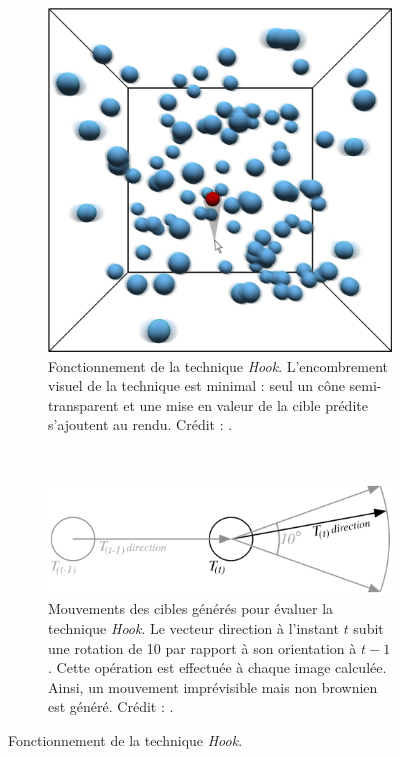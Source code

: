 	\begin{figure}[htb]
		\begin{subfigure}{.29\textwidth}
			\centering
			\includegraphics[width=\textwidth]{figures/ch2/hookPic}
			\caption[\emph{Hook} -- fonctionnement]{Fonctionnement de la technique \emph{Hook}. L'encombrement visuel de la technique est minimal : seul un cône semi-transparent et une mise en valeur de la cible prédite s'ajoutent au rendu. Crédit : \cite{ortega2013hook}.}
			\label{fig:hookPic}
		\end{subfigure}
		~
		\begin{subfigure}{.69\textwidth}
			\centering
			\includegraphics[width=\textwidth]{figures/ch2/hookDir}
			\caption[\emph{Hook} -- mouvements des cibles]{Mouvements des cibles générés pour évaluer la technique \emph{Hook}. Le vecteur direction à l'instant $t$ subit une rotation de 10\textdegree{} par rapport à son orientation à $t-1$. Cette opération est effectuée à chaque image calculée. Ainsi, un mouvement imprévisible mais non brownien est généré. Crédit : \cite{ortega2013hook}.}
			\label{fig:hookDir}
		\end{subfigure}
		\caption[\emph{Hook} -- fonctionnement]{Fonctionnement de la technique \emph{Hook}.}
		\label{fig:hook}
	\end{figure}
	
